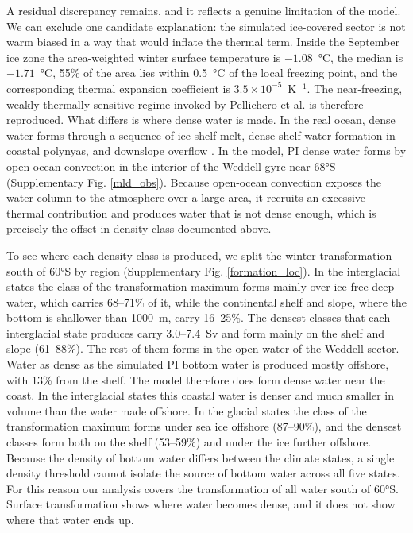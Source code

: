 \documentclass[pdflatex,sn-nature]{sn-jnl}
\begin{document}
A residual discrepancy remains, and it reflects a genuine limitation of the model. We can exclude one candidate explanation: the simulated ice-covered sector is not warm biased in a way that would inflate the thermal term. Inside the September ice zone the area-weighted winter surface temperature is $-1.08$~°C, the median is $-1.71$~°C, 55\% of the area lies within 0.5~°C of the local freezing point, and the corresponding thermal expansion coefficient is $3.5\times10^{-5}$~K$^{-1}$. The near-freezing, weakly thermally sensitive regime invoked by Pellichero et al. is therefore reproduced. What differs is where dense water is made. In the real ocean, dense water forms through a sequence of ice shelf melt, dense shelf water formation in coastal polynyas, and downslope overflow \cite{Orsi1999,ToggweilerSamuels1995}. In the model, PI dense water forms by open-ocean convection in the interior of the Weddell gyre near 68°S (Supplementary Fig. \ref{mld_obs}). Because open-ocean convection exposes the water column to the atmosphere over a large area, it recruits an excessive thermal contribution and produces water that is not dense enough, which is precisely the offset in density class documented above.

To see where each density class is produced, we split the winter transformation south of 60°S by region (Supplementary Fig. \ref{formation_loc}). In the interglacial states the class of the transformation maximum forms mainly over ice-free deep water, which carries 68--71\% of it, while the continental shelf and slope, where the bottom is shallower than 1000~m, carry 16--25\%. The densest classes that each interglacial state produces carry 3.0--7.4~Sv and form mainly on the shelf and slope (61--88\%). The rest of them forms in the open water of the Weddell sector. Water as dense as the simulated PI bottom water is produced mostly offshore, with 13\% from the shelf. The model therefore does form dense water near the coast. In the interglacial states this coastal water is denser and much smaller in volume than the water made offshore. In the glacial states the class of the transformation maximum forms under sea ice offshore (87--90\%), and the densest classes form both on the shelf (53--59\%) and under the ice further offshore. Because the density of bottom water differs between the climate states, a single density threshold cannot isolate the source of bottom water across all five states. For this reason our analysis covers the transformation of all water south of 60°S. Surface transformation shows where water becomes dense, and it does not show where that water ends up.
\end{document}
